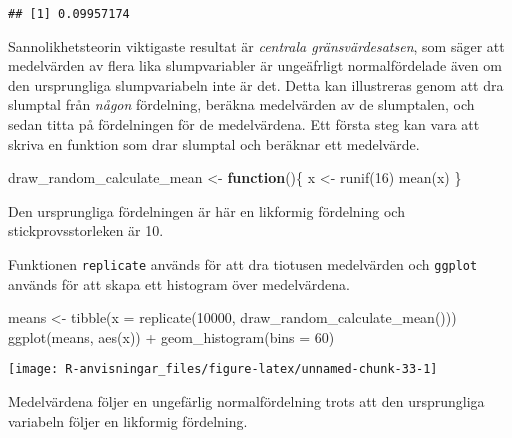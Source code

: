 \documentclass[
]{book}
\newenvironment{Shaded}{\begin{snugshade}}{\end{snugshade}}
\newcommand{\AttributeTok}[1]{\textcolor[rgb]{0.77,0.63,0.00}{#1}}
\newcommand{\ControlFlowTok}[1]{\textcolor[rgb]{0.13,0.29,0.53}{\textbf{#1}}}
\newcommand{\DecValTok}[1]{\textcolor[rgb]{0.00,0.00,0.81}{#1}}
\newcommand{\FunctionTok}[1]{\textcolor[rgb]{0.00,0.00,0.00}{#1}}
\newcommand{\NormalTok}[1]{#1}
\newcommand{\OtherTok}[1]{\textcolor[rgb]{0.56,0.35,0.01}{#1}}
\newcommand{\SpecialCharTok}[1]{\textcolor[rgb]{0.00,0.00,0.00}{#1}}
\theoremstyle{definition}
\theoremstyle{definition}
\theoremstyle{definition}
\theoremstyle{definition}
\theoremstyle{remark}
\begin{document}
\begin{verbatim}
## [1] 0.09957174
\end{verbatim}

Sannolikhetsteorin viktigaste resultat är \emph{centrala gränsvärdesatsen}, som säger att medelvärden av flera lika slumpvariabler är ungeäfrligt normalfördelade även om den ursprungliga slumpvariabeln inte är det. Detta kan illustreras genom att dra slumptal från \emph{någon} fördelning, beräkna medelvärden av de slumptalen, och sedan titta på fördelningen för de medelvärdena. Ett första steg kan vara att skriva en funktion som drar slumptal och beräknar ett medelvärde.

\begin{Shaded}
\begin{Highlighting}[]
\NormalTok{draw\_random\_calculate\_mean }\OtherTok{\textless{}{-}} \ControlFlowTok{function}\NormalTok{()\{}
\NormalTok{  x }\OtherTok{\textless{}{-}} \FunctionTok{runif}\NormalTok{(}\DecValTok{16}\NormalTok{)}
  \FunctionTok{mean}\NormalTok{(x)}
\NormalTok{\}}
\end{Highlighting}
\end{Shaded}

Den ursprungliga fördelningen är här en likformig fördelning och stickprovsstorleken är 10.

Funktionen \texttt{replicate} används för att dra tiotusen medelvärden och \texttt{ggplot} används för att skapa ett histogram över medelvärdena.

\begin{Shaded}
\begin{Highlighting}[]
\NormalTok{means }\OtherTok{\textless{}{-}} \FunctionTok{tibble}\NormalTok{(}\AttributeTok{x =} \FunctionTok{replicate}\NormalTok{(}\DecValTok{10000}\NormalTok{, }\FunctionTok{draw\_random\_calculate\_mean}\NormalTok{()))}
\FunctionTok{ggplot}\NormalTok{(means, }\FunctionTok{aes}\NormalTok{(x)) }\SpecialCharTok{+}
  \FunctionTok{geom\_histogram}\NormalTok{(}\AttributeTok{bins =} \DecValTok{60}\NormalTok{)}
\end{Highlighting}
\end{Shaded}

\begin{center}\texttt{[image: R-anvisningar\_files/figure-latex/unnamed-chunk-33-1]} \end{center}

Medelvärdena följer en ungefärlig normalfördelning trots att den ursprungliga variabeln följer en likformig fördelning.
\end{document}
